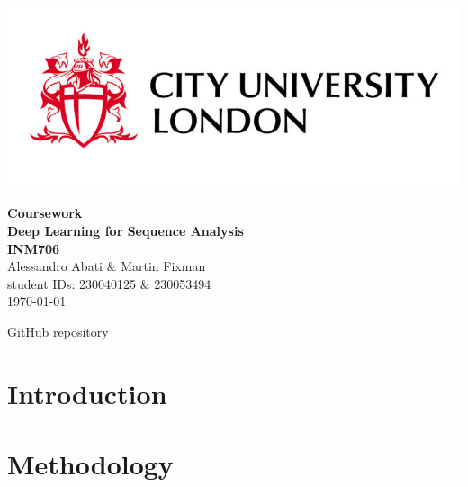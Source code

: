 \documentclass[a4paper, 11pt]{article}
\begin{document}
\begin{titlepage}
    \begin{minipage}{0.5\textwidth}
        \vspace{-2cm}
        \hspace{-1cm}
        \includegraphics[width=1\textwidth]{uni_logo.jpg}
    \end{minipage}
    \begin{center}
        \vspace{6cm}
        \begin{minipage}{0.7\textwidth}
        \centering
        {\huge\bfseries Coursework \vspace{10pt}\\ Deep Learning for Sequence Analysis  \vspace{10pt} \\ INM706}\\[2ex]
        \vspace{15pt}
        {\LARGE Alessandro Abati \& Martin Fixman}\\[1ex]
        {\large student IDs: 230040125 \& 230053494}\\[1ex]
        {\Large \today}
        \end{minipage}
    \end{center}
    \begin{center}
        {\Large \href{https://github.com/mfixman/ai-sequential}{GitHub repository}}
    \end{center}
\end{titlepage}

\newpage
\thispagestyle{empty}
\tableofcontents

\newpage
\thispagestyle{empty}
\section*{Introduction}

\newpage
\setcounter{page}{1}
\section{Methodology}
\end{document}
